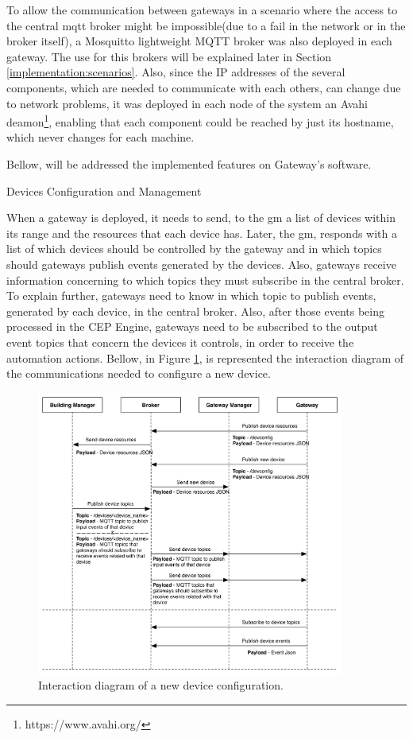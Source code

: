 To allow the communication between gateways in a scenario where the access to the central \ac{mqtt} broker might be impossible(due to a fail in the network or in the broker itself), a Mosquitto lightweight MQTT broker was also deployed in each gateway. The use for this brokers will be explained later in Section \ref{implementation:scenarios}. Also, since the IP addresses of the several components, which are needed to communicate with each others, can change due to network problems, it was deployed in each node of the system an Avahi deamon\footnote{https://www.avahi.org/}, enabling that each component could be reached by just its hostname, which never changes for each machine.

Bellow, will be addressed the implemented features on Gateway's software.

\begin{Paragraph}{Devices Configuration and Management}

When a gateway is deployed, it needs to send, to the \ac{gm} a list of devices within its range and the resources that each device has. Later, the \ac{gm}, responds with a list of which devices should be controlled by the gateway and in which topics should gateways publish events generated by the devices. Also, gateways receive information concerning to which topics they must subscribe in the central broker. To explain further, gateways need to know in which topic to publish events, generated by each device, in the central broker. Also, after those events being processed in the CEP Engine, gateways need to be subscribed to the output event topics that concern the devices it controls, in order to receive the automation actions. Bellow, in Figure \ref{fig:newdevice}, is represented the interaction diagram of the communications needed to configure a new device. 


\begin{figure}[H]
	\centering
	\includegraphics[width=0.9\textwidth]{figures/newdevice.png}
	\caption{Interaction diagram of a new device configuration.}
	\label{fig:newdevice}
\end{figure}


	
\end{Paragraph}

